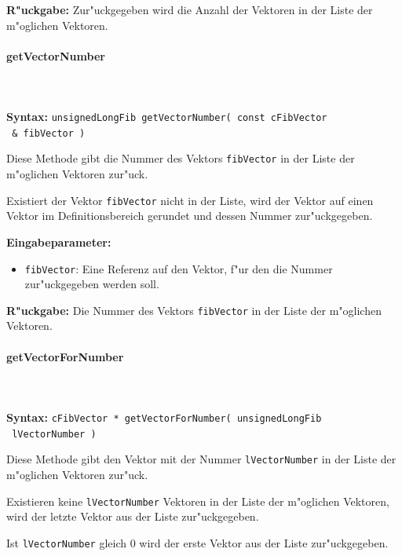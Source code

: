 \bigskip\noindent
\textbf{R"uckgabe:} Zur"uckgegeben wird die Anzahl der Vektoren in der Liste der m"oglichen Vektoren.


\paragraph{getVectorNumber}

\ \\\\\noindent
\textbf{Syntax:} \verb|unsignedLongFib getVectorNumber( const cFibVector| \\\verb| & fibVector )|

\bigskip\noindent
Diese Methode gibt die Nummer des Vektors \verb|fibVector| in der Liste der m"oglichen Vektoren zur"uck.

Existiert der Vektor \verb|fibVector| nicht in der Liste, wird der Vektor auf einen Vektor im Definitionsbereich gerundet und dessen Nummer zur"uckgegeben.

\bigskip\noindent
\textbf{Eingabeparameter:}
\begin{itemize}
 \item \verb|fibVector|: Eine Referenz auf den Vektor, f"ur den die Nummer zur"uckgegeben werden soll.
\end{itemize}

\bigskip\noindent
\textbf{R"uckgabe:} Die Nummer des Vektors \verb|fibVector| in der Liste der m"oglichen Vektoren.


\paragraph{getVectorForNumber}

\ \\\\\noindent
\textbf{Syntax:} \verb|cFibVector * getVectorForNumber( unsignedLongFib| \\\verb| lVectorNumber )|

\bigskip\noindent
Diese Methode gibt den Vektor mit der Nummer \verb|lVectorNumber| in der Liste der m"oglichen Vektoren zur"uck.

Existieren keine \verb|lVectorNumber| Vektoren in der Liste der m"oglichen Vektoren, wird der letzte Vektor aus der Liste zur"uckgegeben.

Ist \verb|lVectorNumber| gleich $0$ wird der erste Vektor aus der Liste zur"uckgegeben.

